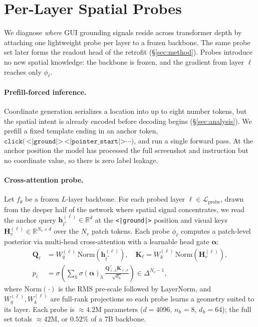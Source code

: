
\section{Per-Layer Spatial Probes}
\label{sec:probe}
\label{sec:method:stage1}

We diagnose \emph{where} GUI grounding signals reside across transformer depth by attaching one lightweight probe per layer to a frozen backbone. The same probe set later forms the readout head of the retrofit (\S\ref{sec:method}). Probes introduce no new spatial knowledge: the backbone is frozen, and the gradient from layer $\ell$ reaches only $\phi_\ell$.

\paragraph{Prefill-forced inference.}
Coordinate generation serializes a location into up to eight number tokens, but the spatial intent is already encoded before decoding begins (\S\ref{sec:analysis}). We prefill a fixed template ending in an anchor token, $\texttt{click(}\,\texttt{<|ground|>}\,\texttt{<|pointer\_start|>}\cdots\texttt{)}$, and run a single forward pass. At the anchor position the model has processed the full screenshot and instruction but no coordinate value, so there is zero label leakage.

\paragraph{Cross-attention probe.}
Let $f_\theta$ be a frozen $L$-layer backbone. For each probed layer $\ell\in\mathcal{L}_{\mathrm{probe}}$, drawn from the deeper half of the network where spatial signal concentrates, we read the anchor query $\mathbf{h}^{(\ell)}_{t^*}\in\mathbb{R}^d$ at the \texttt{<|ground|>} position and visual keys $\mathbf{H}^{(\ell)}_v\in\mathbb{R}^{N_v\times d}$ over the $N_v$ patch tokens. Each probe $\phi_\ell$ computes a patch-level posterior via multi-head cross-attention with a learnable head gate $\boldsymbol{\alpha}$:
\begin{equation}
\begin{aligned}
  \mathbf{Q}_\ell &= W_q^{(\ell)}\,\mathrm{Norm}(\mathbf{h}^{(\ell)}_{t^*}),\quad
  \mathbf{K}_\ell = W_k^{(\ell)}\,\mathrm{Norm}(\mathbf{H}^{(\ell)}_v),\\[-2pt]
  p_\ell &= \sigma\!\left(\textstyle\sum_h \sigma(\boldsymbol{\alpha})_h\,\frac{\mathbf{Q}_{\ell,h}^{\!\top}\mathbf{K}_{\ell,h}}{\sqrt{d_h}}\right)\in\Delta^{N_v-1},
\end{aligned}
\label{eq:probe}
\end{equation}
where $\mathrm{Norm}(\cdot)$ is the RMS pre-scale followed by LayerNorm, and $W_q^{(\ell)},W_k^{(\ell)}$ are full-rank projections so each probe learns a geometry suited to its layer. Each probe is ${\approx}4.2$M parameters ($d{=}4096$, $n_h{=}8$, $d_h{=}64$); the full set totals ${\approx}42$M, or $0.52\%$ of a 7B backbone.

